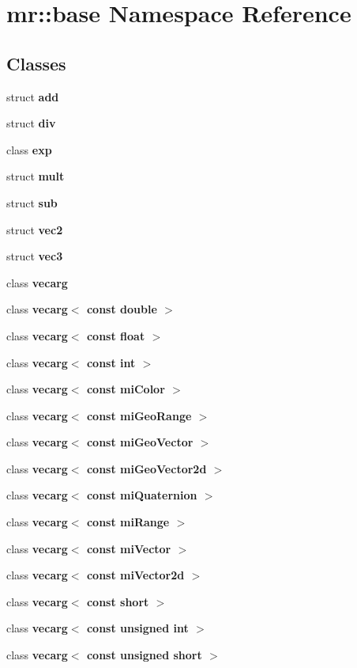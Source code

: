 \section{mr::base Namespace Reference}
\label{namespacemr_1_1base}


\subsection*{Classes}
\begin{CompactItemize}
\item 
struct {\bf add}
\item 
struct {\bf div}
\item 
class {\bf exp}
\item 
struct {\bf mult}
\item 
struct {\bf sub}
\item 
struct {\bf vec2}
\item 
struct {\bf vec3}
\item 
class {\bf vecarg}
\item 
class {\bf vecarg$<$ const double $>$}
\item 
class {\bf vecarg$<$ const float $>$}
\item 
class {\bf vecarg$<$ const int $>$}
\item 
class {\bf vecarg$<$ const mi\-Color $>$}
\item 
class {\bf vecarg$<$ const mi\-Geo\-Range $>$}
\item 
class {\bf vecarg$<$ const mi\-Geo\-Vector $>$}
\item 
class {\bf vecarg$<$ const mi\-Geo\-Vector2d $>$}
\item 
class {\bf vecarg$<$ const mi\-Quaternion $>$}
\item 
class {\bf vecarg$<$ const mi\-Range $>$}
\item 
class {\bf vecarg$<$ const mi\-Vector $>$}
\item 
class {\bf vecarg$<$ const mi\-Vector2d $>$}
\item 
class {\bf vecarg$<$ const short $>$}
\item 
class {\bf vecarg$<$ const unsigned int $>$}
\item 
class {\bf vecarg$<$ const unsigned short $>$}
\end{CompactItemize}
